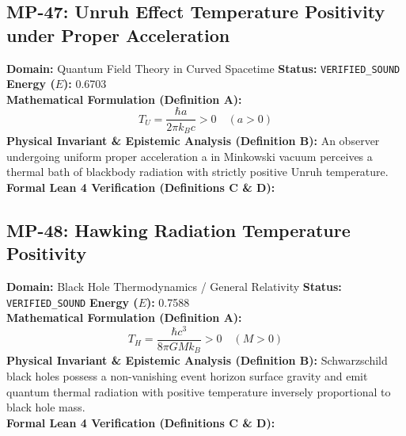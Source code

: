 \vspace{1em}
\subsection{MP-47: Unruh Effect Temperature Positivity under Proper Acceleration}
\textbf{Domain:} Quantum Field Theory in Curved Spacetime \hfill \textbf{Status:} \texttt{VERIFIED\_SOUND} \hfill \textbf{Energy ($E$):} 0.6703\\
\textbf{Mathematical Formulation (Definition A):}
\begin{equation*}
T_U = \frac{\hbar a}{2\pi k_B c} > 0 \quad (a > 0)
\end{equation*}
\textbf{Physical Invariant \& Epistemic Analysis (Definition B):}
An observer undergoing uniform proper acceleration a in Minkowski vacuum perceives a thermal bath of blackbody radiation with strictly positive Unruh temperature.\\

\textbf{Formal Lean 4 Verification (Definitions C \& D):}


\vspace{1em}
\subsection{MP-48: Hawking Radiation Temperature Positivity}
\textbf{Domain:} Black Hole Thermodynamics / General Relativity \hfill \textbf{Status:} \texttt{VERIFIED\_SOUND} \hfill \textbf{Energy ($E$):} 0.7588\\
\textbf{Mathematical Formulation (Definition A):}
\begin{equation*}
T_H = \frac{\hbar c^3}{8\pi G M k_B} > 0 \quad (M > 0)
\end{equation*}
\textbf{Physical Invariant \& Epistemic Analysis (Definition B):}
Schwarzschild black holes possess a non-vanishing event horizon surface gravity and emit quantum thermal radiation with positive temperature inversely proportional to black hole mass.\\

\textbf{Formal Lean 4 Verification (Definitions C \& D):}


\vspace{1em}
